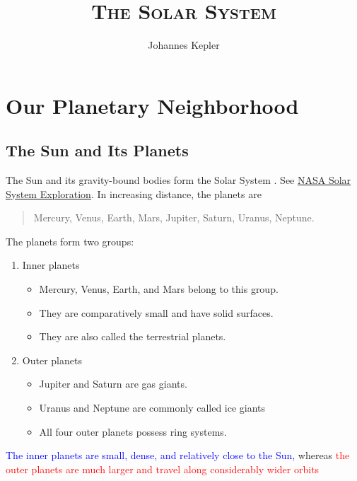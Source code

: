 \documentclass[11pt]{article}
\begin{document}
\title{\textsc{The Solar System}}
\author[1]{Johannes Kepler}
\maketitle

\tableofcontents
\newpage

\section{Our Planetary Neighborhood}
\subsection{The Sun and Its Planets}
The Sun and its gravity-bound bodies form the Solar System \cite{kepler1609}. See \href{https://science.nasa.gov/solar-system/}{NASA
Solar System Exploration}. In increasing distance, the planets are

\begin{quote}
    Mercury, Venus, Earth, Mars, Jupiter, Saturn, Uranus, Neptune.
\end{quote}
The planets form two groups:
\begin{enumerate}[label=(\Roman*)]
    \item Inner planets
    \begin{itemize}[label=$\dagger$]
        \item Mercury, Venus, Earth, and Mars belong to this group.
        \item They are comparatively small and have solid surfaces.
        \item They are also called the terrestrial planets.
    \end{itemize}
    \item Outer planets
    \begin{itemize}[label=$\dagger$]
        \item Jupiter and Saturn are gas giants.
        \item Uranus and Neptune are commonly called ice giants
        \item All four outer planets possess ring systems.
    \end{itemize}
\end{enumerate}

\textcolor{blue}{The inner planets are small, dense, and relatively close to the Sun, } whereas \textcolor{red}{the outer planets are much larger and travel along considerably wider orbits}
\end{document}
